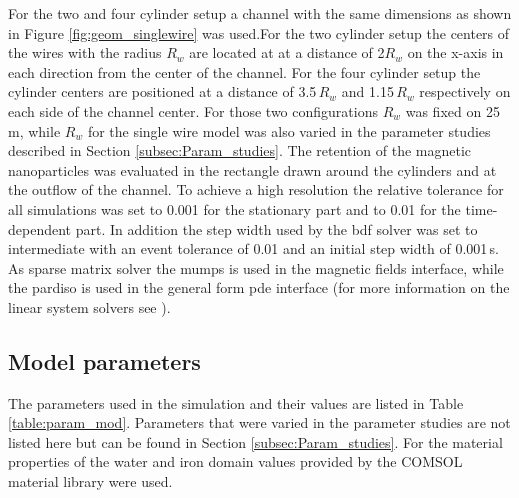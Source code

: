 For the two and four cylinder setup a channel with the same dimensions as shown in Figure \ref{fig:geom_singlewire} was used.For the two cylinder setup the centers of the wires with the radius $R_{w}$ are located at at a distance of 2$R_{w}$ on the x-axis in each direction from the center of the channel. For the four cylinder setup the cylinder centers are positioned at a distance of 3.5\,$R_{w}$ and 1.15\,$R_{w}$ respectively on each side of the channel center. For those two configurations $R_{w}$ was fixed on 25\,\textmu m, while $R_{w}$ for the single wire model was also varied in the parameter studies described in Section \ref{subsec:Param_studies}. The retention of the magnetic nanoparticles was evaluated in the rectangle drawn around the cylinders and at the outflow of the channel. To achieve a high resolution the relative tolerance for all simulations was set to 0.001 for the stationary part and to 0.01 for the time-dependent part. In addition the step width used by the \gls{bdf} solver was set to intermediate with an event tolerance of 0.01 and an initial step width of 0.001\,s. As sparse matrix solver the \gls{mumps} is used in the magnetic fields interface, while the \gls{pardiso} is used in the general form \gls{pde} interface (for more information on the linear system solvers see \cite{ComsolRefManual}).   

\subsection{Model parameters}
\label{subsec:Cond_param}

The parameters used in the simulation and their values are listed in Table \ref{table:param_mod}. Parameters that were varied in the parameter studies are not listed here but can be found in Section \ref{subsec:Param_studies}. For the material properties of the water and iron domain values provided by the COMSOL material library were used.   

